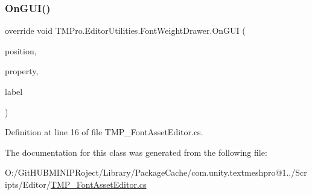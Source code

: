 \subsubsection{\texorpdfstring{OnGUI()}{OnGUI()}}
{\footnotesize\ttfamily override void T\+M\+Pro.\+Editor\+Utilities.\+Font\+Weight\+Drawer.\+On\+G\+UI (\begin{DoxyParamCaption}\item[{Rect}]{position,  }\item[{Serialized\+Property}]{property,  }\item[{G\+U\+I\+Content}]{label }\end{DoxyParamCaption})}



Definition at line 16 of file T\+M\+P\+\_\+\+Font\+Asset\+Editor.\+cs.



The documentation for this class was generated from the following file\+:\begin{DoxyCompactItemize}
\item 
O\+:/\+Git\+H\+U\+B\+M\+I\+N\+I\+P\+Roject/\+Library/\+Package\+Cache/com.\+unity.\+textmeshpro@1../\+Scripts/\+Editor/\mbox{\hyperlink{_t_m_p___font_asset_editor_8cs}{T\+M\+P\+\_\+\+Font\+Asset\+Editor.\+cs}}\end{DoxyCompactItemize}
